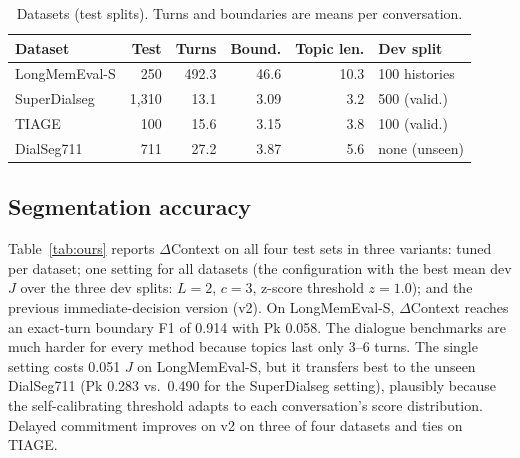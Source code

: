 \documentclass[journal]{IEEEtran}
\newcommand{\dc}{$\Delta$Context}
\begin{document}
\begin{table}[t]
\centering
\caption{Datasets (test splits). Turns and boundaries are means per conversation.}
\label{tab:data}
\footnotesize
\setlength{\tabcolsep}{4pt}
\begin{tabular}{@{}lrrrrl@{}}
\toprule
Dataset & Test & Turns & Bound. & Topic len. & Dev split \\
\midrule
LongMemEval-S & 250 & 492.3 & 46.6 & 10.3 & 100 histories \\
SuperDialseg & 1{,}310 & 13.1 & 3.09 & 3.2 & 500 (valid.) \\
TIAGE & 100 & 15.6 & 3.15 & 3.8 & 100 (valid.) \\
DialSeg711 & 711 & 27.2 & 3.87 & 5.6 & none (unseen) \\
\bottomrule
\end{tabular}
\end{table}

\subsection{Segmentation accuracy}
Table~\ref{tab:ours} reports \dc{} on all four test sets in three variants:
tuned per dataset; one setting for all datasets (the configuration with the
best mean dev $J$ over the three dev splits: $L{=}2$, $c{=}3$, z-score
threshold $z{=}1.0$); and the previous immediate-decision version (v2). On
LongMemEval-S, \dc{} reaches an exact-turn boundary F1 of 0.914 with Pk 0.058.
The dialogue benchmarks are much harder for every method because topics last
only 3--6 turns. The single setting costs 0.051 $J$ on LongMemEval-S, but it
transfers best to the unseen DialSeg711 (Pk 0.283 vs.\ 0.490 for the
SuperDialseg setting), plausibly because the self-calibrating threshold adapts
to each conversation's score distribution. Delayed commitment improves
on v2 on three of four datasets and ties on TIAGE.
\end{document}

